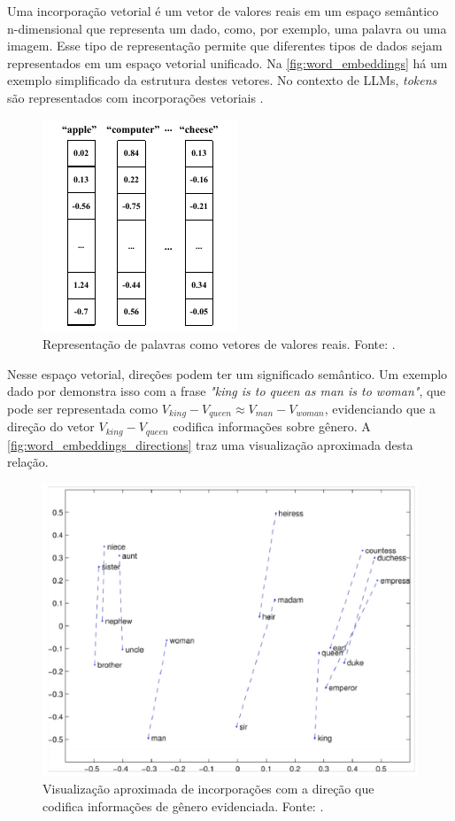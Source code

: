 Uma incorporação vetorial é um vetor de valores reais em um espaço semântico n-dimensional que representa um dado, como, por exemplo, uma palavra ou uma imagem. Esse
tipo de representação permite que diferentes tipos de dados sejam representados em um espaço vetorial unificado. Na \autoref{fig:word_embeddings} há um exemplo
simplificado da estrutura destes vetores. No contexto de \acp{LLM}, \textit{tokens} são representados com incorporações vetoriais \cite{word_embedding, mllm_survey_2023}.

\begin{figure}[ht]
      \centering
      \includegraphics[width=0.3\columnwidth,keepaspectratio]{images/word_embeddings.pdf}
      \caption{Representação de palavras como vetores de valores reais. Fonte: \textcite{word_embedding}.}
      \label{fig:word_embeddings}
\end{figure}

Nesse espaço vetorial, direções podem ter um significado semântico. Um exemplo dado por \textcite{glove} demonstra isso com a frase \textit{"king is to queen as man is
to woman"}, que pode ser representada como \begin{math}V_{king} - V_{queen} \approx V_{man} - V_{woman}\end{math}, evidenciando que a direção do vetor
\begin{math}V_{king} - V_{queen}\end{math} codifica informações sobre gênero. A \autoref{fig:word_embeddings_directions} traz uma visualização aproximada desta relação.

\clearpage

\begin{figure}[ht]
      \centering
      \includegraphics[width=0.6\columnwidth,keepaspectratio]{images/word_embeddings_directions.png}
      \caption{Visualização aproximada de incorporações com a direção que codifica informações de gênero evidenciada. Fonte: \textcite{word_embedding}.}
      \label{fig:word_embeddings_directions}
\end{figure}

